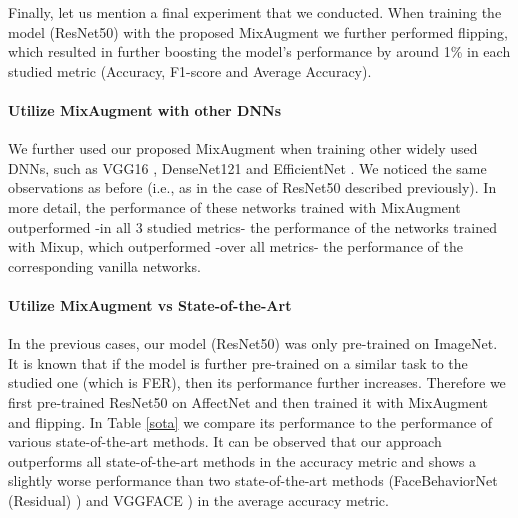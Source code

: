 \documentclass[10pt,twocolumn,letterpaper]{article}
\begin{document}
Finally, let us mention a final experiment that we conducted. When training the model (ResNet50) with the proposed MixAugment we further performed flipping, which resulted in further boosting the model's performance by around 1\% in each studied metric (Accuracy, F1-score and Average Accuracy).
 
 

\paragraph{Utilize MixAugment with other DNNs} We further used our proposed MixAugment when training other widely used DNNs, such as VGG16 \cite{simonyan2014very}, DenseNet121 \cite{huang2017densely} and EfficientNet \cite{tan2019efficientnet}. We noticed the same observations as before (i.e., as in the case of ResNet50 described previously). In more detail, the performance of these  networks trained with MixAugment outperformed -in all 3 studied metrics- the performance of the networks trained with Mixup, which outperformed -over all metrics- the performance of the corresponding vanilla networks. 




\paragraph{Utilize MixAugment vs State-of-the-Art} In the previous cases, our model (ResNet50) was only pre-trained on ImageNet. It is known that if the model is further pre-trained on a similar task to the studied one (which is FER), then its performance further increases. Therefore we first pre-trained ResNet50 on AffectNet and then trained it with MixAugment and flipping. In Table \ref{sota} we compare its performance to the performance of various state-of-the-art methods. 
It can be observed that our approach outperforms all state-of-the-art methods in the accuracy metric and shows a slightly worse performance than two state-of-the-art methods (FaceBehaviorNet (Residual) \cite{kollias2021distribution}) and VGGFACE \cite{kollias2020deep}) in the average accuracy metric.
\end{document}
